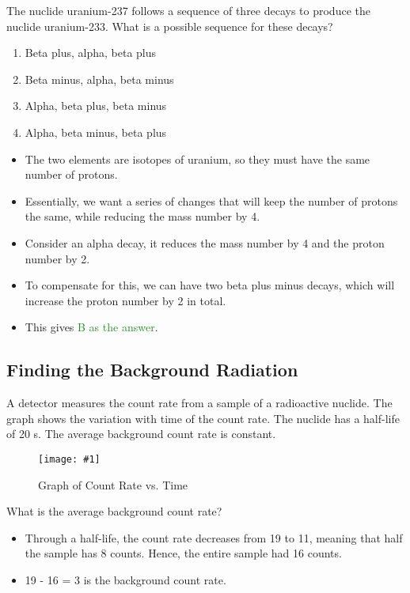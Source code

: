 \documentclass[a4paper,12pt]{article}
\newcommand{\img}[4]{\begin{center}
  \begin{figure}[H]
    \centering
    \texttt{[image: \#1]}
    \caption{#3}
    \label{fig:#4}
  \end{figure}
\end{center}}
\begin{document}
The nuclide uranium-237 follows a sequence of three decays to produce the nuclide uranium-233. What is a possible sequence for these decays?

\begin{enumerate}[label=\Alph*.]
  \item Beta plus, alpha, beta plus
  \item Beta minus, alpha, beta minus
  \item Alpha, beta plus, beta minus
  \item Alpha, beta minus, beta plus
\end{enumerate}

\begin{itemize}
  \item The two elements are isotopes of uranium, so they must have the same number of protons.
  \item Essentially, we want a series of changes that will keep the number of protons the same, while reducing the mass number by 4.
  \item Consider an alpha decay, it reduces the mass number by 4 and the proton number by 2.
  \item To compensate for this, we can have two beta plus minus decays, which will increase the proton number by 2 in total.
  \item This gives \textcolor{ForestGreen}{B as the answer}.
\end{itemize}
\pagebreak

\subsection{Finding the Background Radiation}


A detector measures the count rate from a sample of a radioactive nuclide. The graph shows the variation with time of the count rate.
The nuclide has a half-life of 20 s. The average background count rate is constant.

\img{ex/1.png}{0.8}{Graph of Count Rate vs. Time}{ex1}

What is the average background count rate?

\begin{itemize}
  \item Through a half-life, the count rate decreases from 19 to 11, meaning that half the sample has 8 counts. Hence, the entire sample had 16 counts.
  \item 19 - 16 = 3 is the background count rate.
\end{itemize}
\end{document}
